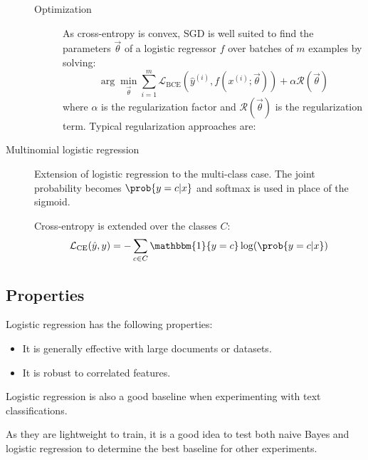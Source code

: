 \begin{description}
\begin{description}
            \item[Optimization]
                As cross-entropy is convex, SGD is well suited to find the parameters $\vec{\theta}$ of a logistic regressor $f$ over batches of $m$ examples by solving:
                \[ \arg\min_{\vec{\theta}} \sum_{i=1}^{m} \mathcal{L}_\text{BCE}(\hat{y}^{(i)}, f(x^{(i)}; \vec{\theta})) + \alpha \mathcal{R}(\vec{\theta}) \]
                where $\alpha$ is the regularization factor and $\mathcal{R}(\vec{\theta})$ is the regularization term. Typical regularization approaches are:
        \end{description}

    \item[Multinomial logistic regression] 
        Extension of logistic regression to the multi-class case. The joint probability becomes $\prob{y = c | x}$ and softmax is used in place of the sigmoid.

        Cross-entropy is extended over the classes $C$:
        \[ \mathcal{L}_\text{CE}(\hat{y}, y) = - \sum_{c \in C} \mathbbm{1}\{y = c\} \log(\prob{y = c | x}) \]
\end{description}


\subsection{Properties}

Logistic regression has the following properties:
\begin{itemize}
    \item It is generally effective with large documents or datasets.
    \item It is robust to correlated features.
\end{itemize}

\begin{remark}
    Logistic regression is also a good baseline when experimenting with text classifications.

    As they are lightweight to train, it is a good idea to test both naive Bayes and logistic regression to determine the best baseline for other experiments.
\end{remark}




